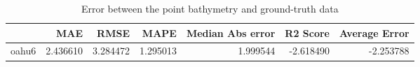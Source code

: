 \begin{table}[h!]
\caption{Error between the point bathymetry and ground-truth data}
\label{tab:oahu6_lidar_error}
\begin{tabular}{lrrrrrr}
\toprule
 & MAE & RMSE & MAPE & Median Abs error & R2 Score & Average Error \\
\midrule
oahu6 & 2.436610 & 3.284472 & 1.295013 & 1.999544 & -2.618490 & -2.253788 \\
\bottomrule
\end{tabular}
\end{table}
